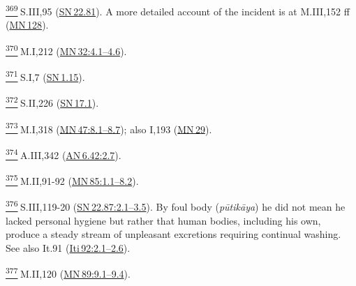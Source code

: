 \label{footprints_split_024.html_fn369}
\hyperref[footprints_split_011.htmlux5cux23fnref369]{\textsuperscript{369}} S.III,95
(\href{https://suttacentral.net/sn22.81/en/sujato}{SN\,22.81}). A more
detailed account of the incident is at M.III,152 ff
(\href{https://suttacentral.net/mn128/en/sujato}{MN\,128}).

\label{footprints_split_024.html_fn370}
\hyperref[footprints_split_011.htmlux5cux23fnref370]{\textsuperscript{370}} M.I,212
(\href{https://suttacentral.net/mn32/en/sujato\#4.1}{MN\,32:4.1--4.6}).

\label{footprints_split_024.html_fn371}
\hyperref[footprints_split_011.htmlux5cux23fnref371]{\textsuperscript{371}} S.I,7
(\href{https://suttacentral.net/sn1.15/en/sujato}{SN\,1.15}).

\label{footprints_split_024.html_fn372}
\hyperref[footprints_split_011.htmlux5cux23fnref372]{\textsuperscript{372}} S.II,226
(\href{https://suttacentral.net/sn17.1/en/sujato}{SN\,17.1}).

\label{footprints_split_024.html_fn373}
\hyperref[footprints_split_011.htmlux5cux23fnref373]{\textsuperscript{373}} M.I,318
(\href{https://suttacentral.net/mn47/en/sujato\#8.1}{MN\,47:8.1--8.7});
also I,193 (\href{https://suttacentral.net/mn29/en/sujato}{MN\,29}).

\label{footprints_split_024.html_fn374}
\hyperref[footprints_split_011.htmlux5cux23fnref374]{\textsuperscript{374}} A.III,342
(\href{https://suttacentral.net/an6.42/en/sujato\#2.7}{AN\,6.42:2.7}).

\label{footprints_split_024.html_fn375}
\hyperref[footprints_split_011.htmlux5cux23fnref375]{\textsuperscript{375}} M.II,91-92
(\href{https://suttacentral.net/mn85/en/sujato\#1.1}{MN\,85:1.1--8.2}).

\label{footprints_split_024.html_fn376}
\hyperref[footprints_split_011.htmlux5cux23fnref376]{\textsuperscript{376}} S.III,119-20
(\href{https://suttacentral.net/sn22.87/en/sujato\#2.1}{SN\,22.87:2.1--3.5}).
By foul body (\emph{pūtikāya}) he did not mean he lacked personal
hygiene but rather that human bodies, including his own, produce a
steady stream of unpleasant excretions requiring continual washing. See
also It.91
(\href{https://suttacentral.net/iti92/en/sujato\#2.1}{Iti\,92:2.1--2.6}).

\label{footprints_split_024.html_fn377}
\hyperref[footprints_split_011.htmlux5cux23fnref377]{\textsuperscript{377}} M.II,120
(\href{https://suttacentral.net/mn89/en/sujato\#9.1}{MN\,89:9.1--9.4}).

